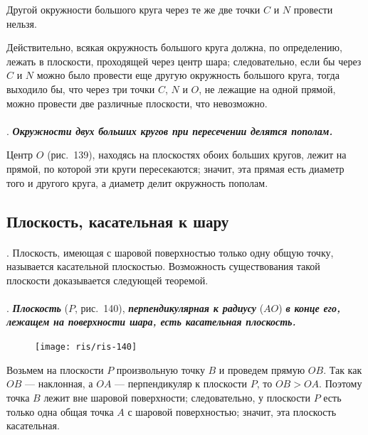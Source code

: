 \documentclass[twoside]{book}
\begin{document}
Другой окружности большого круга через те же две точки $C$ и $N$ провести нельзя.

Действительно, всякая окружность большого круга должна, по определению, лежать в плоскости, проходящей через центр шара;
следовательно, если бы через $C$ и $N$ можно было провести еще другую окружность большого круга, тогда выходило бы, что через три точки $C$, $N$ и $O$, не лежащие на одной прямой, можно провести две различные плоскости, что невозможно.

\paragraph{}\label{1938/s130}
.
\textbf{\emph{Окружности двух больших кругов при пересечении делятся пополам.}}

Центр $O$ (рис.~139), находясь на плоскостях обоих больших кругов, лежит на прямой, по которой эти круги пересекаются;
значит, эта прямая есть диаметр того и другого круга, а диаметр делит окружность пополам.

\subsection*{Плоскость, касательная к шару}

\paragraph{}\label{1938/s131}
.
Плоскость, имеющая с шаровой поверхностью только одну общую точку, называется касательной плоскостью.
Возможность существования такой плоскости доказывается следующей теоремой.

\paragraph{}\label{1938/s132}
.
\textbf{\emph{Плоскость}} ($P$, рис.~140), \textbf{\emph{перпендикулярная к радиусу}} ($AO$) \textbf{\emph{в конце его, лежащем на поверхности шара, есть касательная плоскость.}} %

\begin{figure}[h!]
\centering
\texttt{[image: ris/ris-140]}
\caption{}
\end{figure}

Возьмем на плоскости $P$ произвольную точку $B$ и проведем прямую $OB$.
Так как $OB$ --- наклонная, а $OA$ --- перпендикуляр к плоскости $P$, то $OB>OA$.
Поэтому точка $B$ лежит вне шаровой поверхности; %
следовательно, у плоскости $P$ есть только одна общая точка $A$ с шаровой поверхностью;
значит, эта плоскость касательная.
\end{document}
